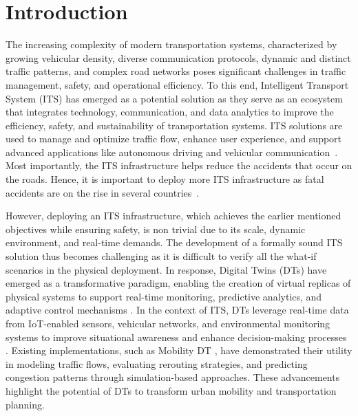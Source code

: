 \section{Introduction}  

The increasing complexity of modern transportation systems, characterized by growing vehicular density, diverse communication protocols, dynamic and distinct traffic patterns, and complex road networks poses significant challenges in traffic management, safety, and operational efficiency. To this end, Intelligent Transport System (ITS) has emerged as a potential solution as they serve as an ecosystem that integrates technology, communication, and data analytics to improve the efficiency, safety, and sustainability of transportation systems.
ITS solutions are used to manage and optimize traffic flow, enhance user experience, and support advanced applications like autonomous driving and vehicular communication~\cite{perallos2015intelligent, andersen2000intelligent}. Most importantly, the ITS infrastructure helps reduce the accidents that occur on the roads. Hence, it is important to deploy more ITS infrastructure as fatal accidents are on the rise in several countries~\cite{NHTSA_Traffic_Stats, Road_Accidents_India}.


However, deploying an ITS infrastructure, which achieves the earlier mentioned objectives while ensuring safety, is non trivial due to its scale, dynamic environment, and real-time demands. The development of a formally sound ITS solution thus becomes challenging as it is difficult to verify all the what-if scenarios in the physical deployment. In response, Digital Twins (DTs) have emerged as a transformative paradigm, enabling the creation of virtual replicas of physical systems to support real-time monitoring, predictive analytics, and adaptive control mechanisms \cite{grieves2017digital}\cite{liu2021review}\cite{barricelli2019survey}\cite{feng2023resilience}. In the context of ITS, DTs leverage real-time data from IoT-enabled sensors, vehicular networks, and environmental monitoring systems to improve situational awareness and enhance decision-making processes \cite{jafari2023review}. Existing implementations, such as Mobility DT \cite{mobilityWang}, have demonstrated their utility in modeling traffic flows, evaluating rerouting strategies, and predicting congestion patterns through simulation-based approaches. These advancements highlight the potential of DTs to transform urban mobility and transportation planning.  

